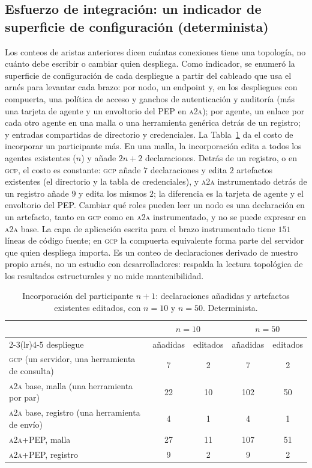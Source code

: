 \documentclass[conference,letterpaper]{IEEEtran}
\newcommand{\gcp}{\textsc{gcp}}
\newcommand{\ata}{\textsc{a2a}}
\begin{document}
\subsection{Esfuerzo de integración: un indicador de superficie de configuración (determinista)}
\label{sec:effort}
Los conteos de aristas anteriores dicen cuántas conexiones tiene una topología, no cuánto debe escribir o
cambiar quien despliega. Como indicador, se enumeró la superficie de configuración de cada despliegue a
partir del cableado que usa el arnés para levantar cada brazo: por nodo, un endpoint y, en los despliegues
con compuerta, una política de acceso y ganchos de autenticación y auditoría (más una tarjeta de agente y un
envoltorio del PEP en \ata{}); por agente, un enlace por cada otro agente en una malla o una herramienta
genérica detrás de un registro; y entradas compartidas de directorio y credenciales. La
Tabla~\ref{tab:effort} da el costo de incorporar un participante más. En una malla, la incorporación edita a
todos los agentes existentes ($n$) y añade $2n+2$ declaraciones. Detrás de un registro, o en \gcp{}, el
costo es constante: \gcp{} añade $7$ declaraciones y edita $2$ artefactos existentes (el directorio y la
tabla de credenciales), y \ata{} instrumentado detrás de un registro añade $9$ y edita los mismos $2$; la
diferencia es la tarjeta de agente y el envoltorio del PEP. Cambiar qué roles pueden leer un nodo es una
declaración en un artefacto, tanto en \gcp{} como en \ata{} instrumentado, y no se puede expresar en \ata{}
base. La capa de aplicación escrita para el brazo instrumentado tiene $151$ líneas de código fuente; en
\gcp{} la compuerta equivalente forma parte del servidor que quien despliega importa. Es un conteo de
declaraciones derivado de nuestro propio arnés, no un estudio con desarrolladores: respalda la lectura
topológica de los resultados estructurales y no mide mantenibilidad.

\begin{table}[H]
\centering
\caption{Incorporación del participante $n{+}1$: declaraciones añadidas y artefactos existentes editados,
con $n=10$ y $n=50$. Determinista.}
\label{tab:effort}
\footnotesize
\setlength{\tabcolsep}{3.5pt}
\begin{tabular}{lcccc}
\toprule
 & \multicolumn{2}{c}{$n=10$} & \multicolumn{2}{c}{$n=50$} \\
\cmidrule(lr){2-3}\cmidrule(lr){4-5}
despliegue & añadidas & editados & añadidas & editados \\
\midrule
\gcp{} (un servidor, una herramienta de consulta)      & 7 & 2 & 7 & 2 \\
\ata{} base, malla (una herramienta por par)  & 22 & 10 & 102 & 50 \\
\ata{} base, registro (una herramienta de envío) & 4 & 1 & 4 & 1 \\
\ata{}+PEP, malla                       & 27 & 11 & 107 & 51 \\
\ata{}+PEP, registro                   & 9 & 2 & 9 & 2 \\
\bottomrule
\end{tabular}
\end{table}
\end{document}
